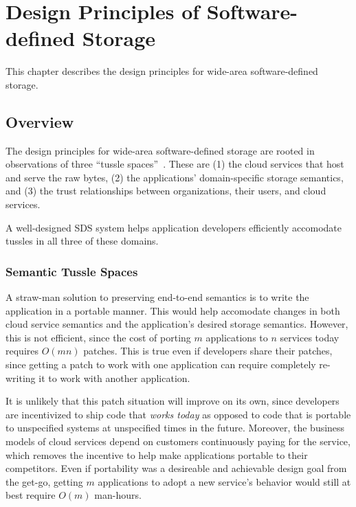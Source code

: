 \chapter{Design Principles of Software-defined Storage}
\label{chap:design_principles}

This chapter describes the design principles for wide-area
software-defined storage.  

\section{Overview}

The design principles for wide-area software-defined storage are rooted in 
observations of three ``tussle spaces''~\cite{david-clark-tussle-spaces}.
These are (1) the cloud services that host and serve the raw
bytes, (2) the applications' domain-specific storage semantics, and (3) the trust
relationships between organizations, their users, and cloud services.

A well-designed SDS system helps application developers efficiently accomodate tussles
in all three of these domains.

\subsection{Semantic Tussle Spaces}

A straw-man solution to preserving end-to-end semantics is to write the
application in a portable manner.  This would help accomodate changes in both
cloud service semantics and the application's desired storage semantics.
However, this is not efficient, since 
the cost of porting $m$ applications to $n$ services
today requires $O(mn)$ patches.  This is true even if developers share their
patches, since getting a patch to work with one application can require completely
re-writing it to work with another application.

It is unlikely that this patch situation will improve on its own,
since developers are incentivized to ship code that \emph{works
today} as opposed to code that is portable to unspecified systems at unspecified
times in the future.  Moreover, the business models of cloud services
depend on customers continuously paying for the service, which removes the
incentive to help make applications portable to their competitors.
Even if portability was a desireable and achievable design goal from the get-go,
getting $m$ applications to adopt a new service's behavior would still at best
require $O(m)$ man-hours.

